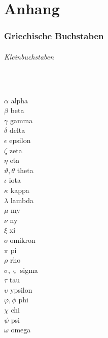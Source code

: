 \documentclass[fontsize=11pt, twoside=false, numbers=autoenddot]{scrbook}
\begin{document}
\part*{Anhang}

\section*{Griechische Buchstaben}

\paragraph*{Kleinbuchstaben}
~\par%
$\alpha$ \dotfill alpha \\
$\beta$ \dotfill beta \\
$\gamma$ \dotfill gamma \\
$\delta$ \dotfill delta \\
$\epsilon$ \dotfill epsilon \\
$\zeta$ \dotfill zeta \\
$\eta$ \dotfill eta \\
$\vartheta,\theta$ \dotfill theta \\
$\iota$ \dotfill iota \\
$\kappa$ \dotfill kappa \\
$\lambda$ \dotfill lambda\\
$\mu$ \dotfill my\\
$\nu$ \dotfill ny \\
$\xi$ \dotfill xi\\
$o$ \dotfill omikron\\
$\pi$ \dotfill pi\\
$\rho$ \dotfill rho\\
$\sigma,\varsigma$ \dotfill sigma\\
$\tau$ \dotfill tau\\
$\upsilon$ \dotfill ypsilon\\
$\varphi,\phi$ \dotfill phi\\
$\chi$ \dotfill chi\\
$\psi$ \dotfill psi\\
$\omega$ \dotfill omega
\end{document}
